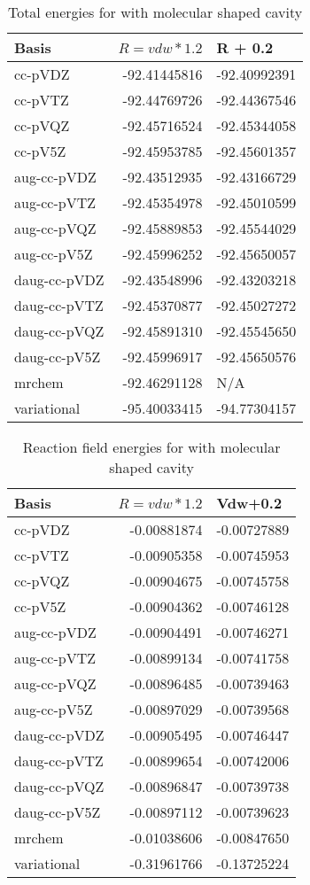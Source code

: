 \documentclass[../master_thesis.tex]{subfiles}
\begin{document}
\begin{table}[htbp]
\caption{Total energies for  with molecular shaped cavity}
\begin{tabular}{l|r|r}
Basis & \multicolumn{1}{l|}{$R = vdw*1.2$} & \multicolumn{1}{l|}{R + 0.2} \\ \hline
cc-pVDZ & -92.41445816 & -92.40992391 \\
cc-pVTZ & -92.44769726 & -92.44367546 \\
cc-pVQZ & -92.45716524 & -92.45344058 \\
cc-pV5Z & -92.45953785 & -92.45601357 \\ \hline
aug-cc-pVDZ & -92.43512935 & -92.43166729 \\
aug-cc-pVTZ & -92.45354978 & -92.45010599 \\
aug-cc-pVQZ & -92.45889853 & -92.45544029 \\
aug-cc-pV5Z & -92.45996252 & -92.45650057 \\ \hline
daug-cc-pVDZ & -92.43548996 & -92.43203218 \\
daug-cc-pVTZ & -92.45370877 & -92.45027272 \\
daug-cc-pVQZ & -92.45891310 & -92.45545650 \\
daug-cc-pV5Z & -92.45996917 & -92.45650576 \\ \hline
mrchem & -92.46291128 & \multicolumn{1}{l|}{N/A} \\
variational & -95.40033415 & -94.77304157 \\
\end{tabular}
\label{tab:cyanrawdataabc}
\end{table}

\begin{table}[htbp]
\caption{Reaction field  energies for  with molecular shaped cavity}
\begin{tabular}{l|r|r}
Basis & \multicolumn{1}{l|}{$R = vdw*1.2$} & \multicolumn{1}{l|}{Vdw+0.2} \\ \hline
cc-pVDZ & -0.00881874 & -0.00727889 \\
cc-pVTZ & -0.00905358 & -0.00745953 \\
cc-pVQZ & -0.00904675 & -0.00745758 \\
cc-pV5Z & -0.00904362 & -0.00746128 \\ \hline
aug-cc-pVDZ & -0.00904491 & -0.00746271 \\
aug-cc-pVTZ & -0.00899134 & -0.00741758 \\
aug-cc-pVQZ & -0.00896485 & -0.00739463 \\
aug-cc-pV5Z & -0.00897029 & -0.00739568 \\ \hline
daug-cc-pVDZ & -0.00905495 & -0.00746447 \\
daug-cc-pVTZ & -0.00899654 & -0.00742006 \\
daug-cc-pVQZ & -0.00896847 & -0.00739738 \\
daug-cc-pV5Z & -0.00897112 & -0.00739623 \\ \hline
mrchem & -0.01038606 & -0.00847650 \\
variational & -0.31961766 & -0.13725224 \\
\end{tabular}
\label{tab:abcErwat}
\end{table}
\end{document}
